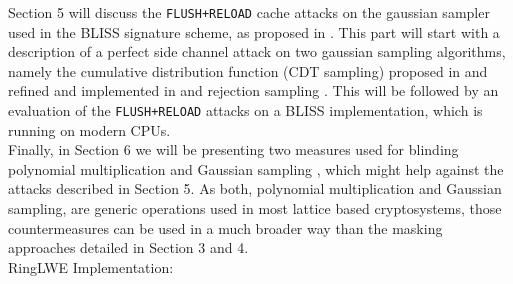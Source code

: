 Section 5 will discuss the \verb|FLUSH+RELOAD| cache attacks on the gaussian sampler used in the BLISS signature scheme, as proposed in \cite{cryptoeprint:2016:300}. 
This part will start with a description of a perfect side channel attack on two gaussian sampling algorithms, namely the cumulative distribution function (CDT sampling) proposed in \cite{cryptoeprint:2010:088} and refined and implemented in \cite{cryptoeprint:2014:254} and rejection sampling \cite{cryptoeprint:2013:383}. This will be followed by an evaluation of the \verb|FLUSH+RELOAD| attacks on a BLISS implementation, which is running on modern CPUs.\\
Finally, in Section 6 we will be presenting two measures used for blinding polynomial multiplication and Gaussian sampling \cite{cryptoeprint:2016:276}, which might help against the attacks described in Section 5. As both, polynomial multiplication and Gaussian sampling, are generic operations used in most lattice based cryptosystems, those countermeasures can be used in a much broader way than the masking approaches detailed in Section 3 and 4.\\

RingLWE Implementation: \cite{Pöppelmann2014} \\